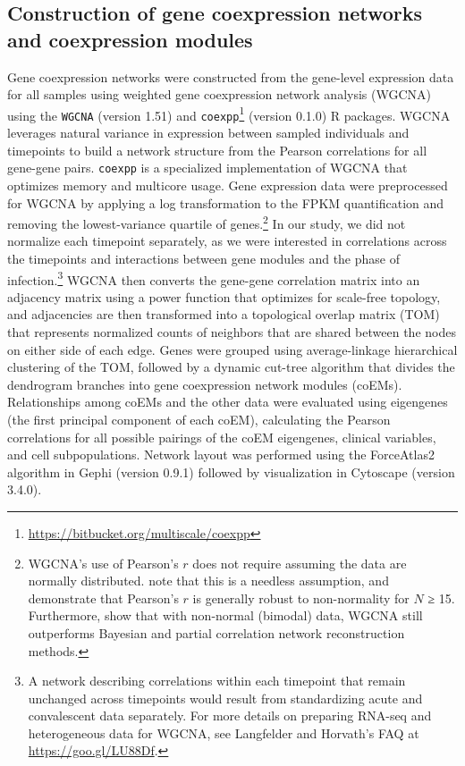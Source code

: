 \subsection{Construction of gene coexpression networks and coexpression modules}

Gene coexpression networks were constructed from the gene-level expression data for all samples using weighted gene coexpression network analysis (WGCNA) using the \texttt{WGCNA}\autocite{Zhang2005} (version 1.51) and \texttt{coexpp}\footnote{\url{https://bitbucket.org/multiscale/coexpp}} (version 0.1.0) R packages. WGCNA leverages natural variance in expression between sampled individuals and timepoints to build a network structure from the Pearson correlations for all gene-gene pairs.\autocite{Zhang2005} \texttt{coexpp} is a specialized implementation of WGCNA that optimizes memory and multicore usage. Gene expression data were preprocessed for WGCNA by applying a log transformation to the FPKM quantification and removing the lowest-variance quartile of genes.\footnote[][-1.5cm]{WGCNA's use of Pearson's $r$ does not require assuming the data are normally distributed. \textcite{Nefzger1957} note that this is a needless assumption, and \textcite{Edgell1984} demonstrate that Pearson's $r$ is generally robust to non-normality for $N$ ≥ 15. Furthermore, \textcite{Allen2012} show that with non-normal (bimodal) data, WGCNA still outperforms Bayesian and partial correlation network reconstruction methods.} In our study, we did not normalize each timepoint separately, as we were interested in correlations across the timepoints and interactions between gene modules and the phase of infection.\footnote{A network describing correlations within each timepoint that remain unchanged across timepoints would result from standardizing acute and convalescent data separately. For more details on preparing RNA-seq and heterogeneous data for WGCNA, see Langfelder and Horvath's FAQ at \url{https://goo.gl/LU88Df}.} WGCNA then converts the gene-gene correlation matrix into an adjacency matrix using a power function that optimizes for scale-free topology, and adjacencies are then transformed into a topological overlap matrix (TOM) that represents normalized counts of neighbors that are shared between the nodes on either side of each edge. Genes were grouped using average-linkage hierarchical clustering of the TOM, followed by a dynamic cut-tree algorithm\autocite{Langfelder2008} that divides the dendrogram branches into gene coexpression network modules (coEMs). Relationships among coEMs and the other data were evaluated using eigengenes\autocite{Langfelder2007} (the first principal component of each coEM), calculating the Pearson correlations for all possible pairings of the coEM eigengenes, clinical variables, and cell subpopulations. Network layout was performed using the ForceAtlas2 algorithm in Gephi\autocite{Bastian2009} (version 0.9.1) followed by visualization in Cytoscape\autocite{Smoot2011} (version 3.4.0).

